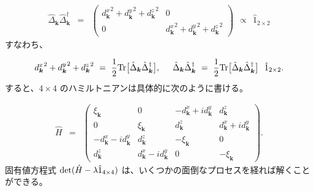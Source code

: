 \documentclass[uplatex,a4j,12pt,dvipdfmx]{jsarticle}
\begin{document}
\begin{eqnarray}
	\hat{\Delta}_{\bm{k}} \hat{\Delta}^{\dagger}_{\bm{k}}
	&=&
	\left(
	\begin{array}{cc}
			{d^{x}_{\bm{k}}}^{2} + {d^{y}_{\bm{k}}}^{2} + {d^{z}_{\bm{k}}}^{2} & 0                                                                     \\[3mm]
			0                                                                     & {d^{x}_{\bm{k}}}^{2} + {d^{y}_{\bm{k}}}^{2} + {d^{z}_{\bm{k}}}^{2}
		\end{array}
	\right)
	\ \ \propto \ \
	\hat{1}_{2 \times 2}
\end{eqnarray}
%
すなわち、

\begin{eqnarray}
	{d^{x}_{\bm{k}}}^{2} + {d^{y}_{\bm{k}}}^{2} + {d^{z}_{\bm{k}}}^{2}
	\ = \
	\dfrac{1}{2}
	{\rm Tr} \big[ \hat{\Delta}_{\bm{k}} \hat{\Delta}^{\dagger}_{\bm{k}} \big]
	, \hspace{5mm}
	\hat{\Delta}_{\bm{k}} \hat{\Delta}^{\dagger}_{\bm{k}}
	\ = \
	\dfrac{1}{2}
	{\rm Tr} \big[ \hat{\Delta}_{\bm{k}} \hat{\Delta}^{\dagger}_{\bm{k}} \big]
	\ \
	\hat{1}_{2 \times 2}
	.
\end{eqnarray}
%
すると、$4 \times 4$ のハミルトニアンは具体的に次のように書ける。

\begin{eqnarray}
	\hat{H}
	&=&
	\left(
	\begin{array}{cccc}
			\xi_{\bm{k}}                         & 0                                   & - d^{x}_{\bm{k}} + i d^{y}_{\bm{k}} & d^{z}_{\bm{k}}                     \\[2mm]
			0                                     & \xi_{\bm{k}}                       & d^{z}_{\bm{k}}                       & d^{x}_{\bm{k}} + i d^{y}_{\bm{k}} \\[2mm]
			- d^{x}_{\bm{k}} - i d^{y}_{\bm{k}} & d^{z}_{\bm{k}}                     & - \xi_{\bm{k}}                       & 0                                   \\[2mm]
			d^{z}_{\bm{k}}                       & d^{x}_{\bm{k}} - i d^{y}_{\bm{k}} & 0                                     & - \xi_{\bm{k}}
		\end{array}
	\right)
	.
\end{eqnarray}
%
固有値方程式 ${\rm det}(\hat{H} - \lambda \hat{1}_{4 \times 4})$ は、いくつかの面倒なプロセスを経れば解くことができる。
\end{document}
